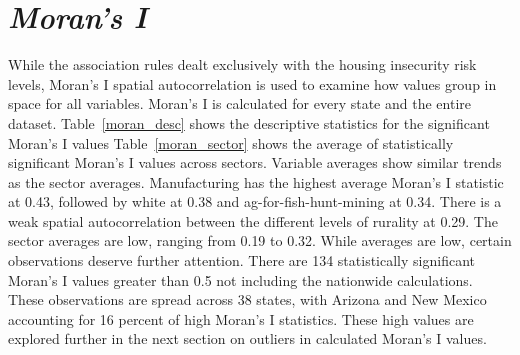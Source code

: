 







\section{\textit{Moran's I}}


While the association rules dealt exclusively with the housing insecurity risk levels, Moran’s I spatial autocorrelation is used to examine how values group in space for all variables. Moran’s I is calculated for every state and the entire dataset.  Table~\ref{moran_desc} shows the descriptive statistics for the significant Moran's I values
Table~\ref{moran_sector} shows the average of statistically significant Moran's I values across sectors. Variable averages show similar trends as the sector averages. Manufacturing has the highest average Moran's I statistic at 0.43, followed by white at 0.38 and ag-for-fish-hunt-mining at 0.34. There is a weak spatial autocorrelation between the different levels of rurality at 0.29.
The sector averages are low, ranging from 0.19 to 0.32. While averages are low, certain observations deserve further attention. There are 134 statistically significant Moran's I values greater than 0.5 not including the nationwide calculations. These observations are spread across 38 states, with Arizona and New Mexico accounting for 16 percent of high Moran's I statistics. These high values are explored further in the next section on outliers in calculated Moran's I values. 






%

